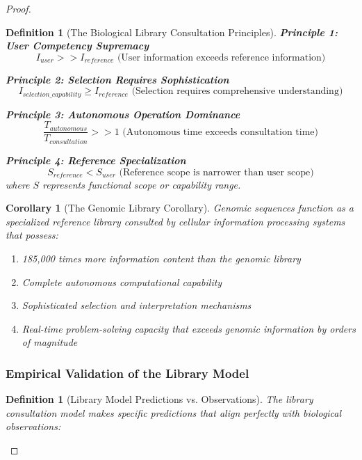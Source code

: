 \documentclass[12pt,a4paper]{article}
\newtheorem{definition}[theorem]{Definition}
\newtheorem{corollary}[theorem]{Corollary}
\begin{document}
\begin{proof}
\begin{definition}[The Biological Library Consultation Principles]
\textbf{Principle 1: User Competency Supremacy}
\begin{equation}
I_{user} >> I_{reference} \text{ (User information exceeds reference information)}
\end{equation}

\textbf{Principle 2: Selection Requires Sophistication}
\begin{equation}
I_{selection\_capability} \geq I_{reference} \text{ (Selection requires comprehensive understanding)}
\end{equation}

\textbf{Principle 3: Autonomous Operation Dominance}
\begin{equation}
\frac{T_{autonomous}}{T_{consultation}} >> 1 \text{ (Autonomous time exceeds consultation time)}
\end{equation}

\textbf{Principle 4: Reference Specialization}
\begin{equation}
S_{reference} < S_{user} \text{ (Reference scope is narrower than user scope)}
\end{equation}
where $S$ represents functional scope or capability range.
\end{definition}

\begin{corollary}[The Genomic Library Corollary]
Genomic sequences function as a specialized reference library consulted by cellular information processing systems that possess:
\begin{enumerate}
\item 185,000 times more information content than the genomic library
\item Complete autonomous computational capability
\item Sophisticated selection and interpretation mechanisms
\item Real-time problem-solving capacity that exceeds genomic information by orders of magnitude
\end{enumerate}
\end{corollary}

\subsubsection{Empirical Validation of the Library Model}

\begin{definition}[Library Model Predictions vs. Observations]
The library consultation model makes specific predictions that align perfectly with biological observations:


\end{definition}
\end{proof}
\end{document}
